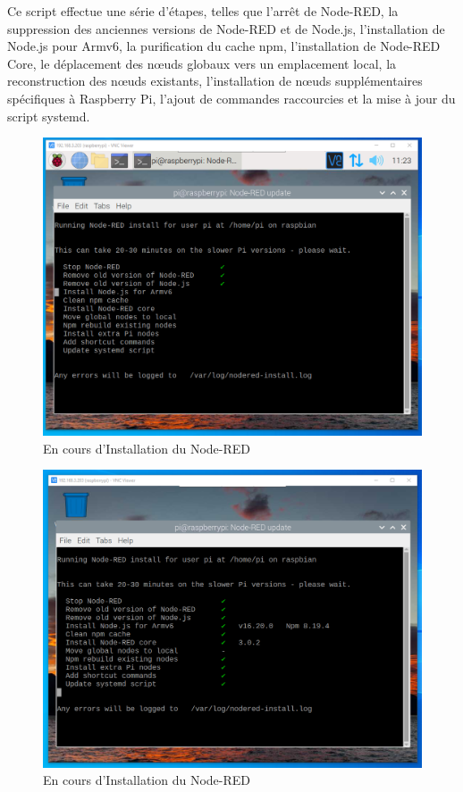 Ce script effectue une série d'étapes, telles que l'arrêt de Node-RED, la suppression des anciennes versions de Node-RED et de Node.js, l'installation de Node.js pour Armv6, la purification du cache npm, l'installation de Node-RED Core, le déplacement des nœuds globaux vers un emplacement local, la reconstruction des nœuds existants, l'installation de nœuds supplémentaires spécifiques à Raspberry Pi, l'ajout de commandes raccourcies et la mise à jour du script systemd. \\


\begin{figure}[H]
 \centering
    \includegraphics[width=13cm]{Images/NodeRedInstall2.png}
    \caption{En cours d'Installation du Node-RED}
    \label{Chap4.3.3}
\end{figure}    
\smallskip

\begin{figure}[H]
 \centering
    \includegraphics[width=13cm]{Images/NodeRedInstall3.png}
    \caption{En cours d'Installation du Node-RED}
    \label{Chap4.3.4}
\end{figure}    
\smallskip


